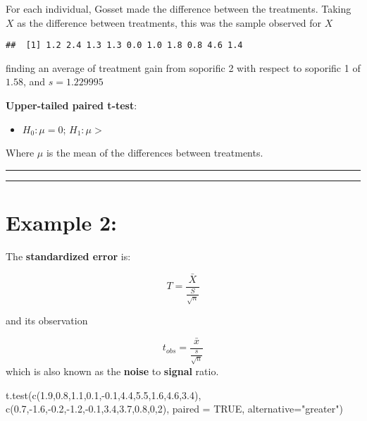 \documentclass[
]{book}
\newenvironment{Shaded}{\begin{snugshade}}{\end{snugshade}}
\newcommand{\AttributeTok}[1]{\textcolor[rgb]{0.77,0.63,0.00}{#1}}
\newcommand{\ConstantTok}[1]{\textcolor[rgb]{0.00,0.00,0.00}{#1}}
\newcommand{\DecValTok}[1]{\textcolor[rgb]{0.00,0.00,0.81}{#1}}
\newcommand{\FloatTok}[1]{\textcolor[rgb]{0.00,0.00,0.81}{#1}}
\newcommand{\FunctionTok}[1]{\textcolor[rgb]{0.00,0.00,0.00}{#1}}
\newcommand{\NormalTok}[1]{#1}
\newcommand{\SpecialCharTok}[1]{\textcolor[rgb]{0.00,0.00,0.00}{#1}}
\newcommand{\StringTok}[1]{\textcolor[rgb]{0.31,0.60,0.02}{#1}}
\providecommand{\tightlist}{%
  \setlength{\itemsep}{0pt}\setlength{\parskip}{0pt}}
\begin{document}
For each individual, Gosset made the difference between the treatments. Taking \(X\) as the difference between treatments, this was the sample observed for \(X\)

\begin{verbatim}
##  [1] 1.2 2.4 1.3 1.3 0.0 1.0 1.8 0.8 4.6 1.4
\end{verbatim}

finding an average of treatment gain from soporific 2 with respect to soporific 1 of \(1.58\), and \(s=1.229995\)

\textbf{Upper-tailed paired t-test}:

\begin{itemize}
\tightlist
\item
  \(H_0:\mu=0\); \(H_1:\mu >\)
\end{itemize}

Where \(\mu\) is the mean of the differences between treatments.

\begin{center}\rule{0.5\linewidth}{0.5pt}\end{center}

\begin{center}\rule{0.5\linewidth}{0.5pt}\end{center}

\hypertarget{example-2-5}{%
\section{Example 2:}\label{example-2-5}}

The \textbf{standardized error} is:

\[T=\frac{\bar{X}}{\frac{S}{\sqrt{n}}}\]

and its observation

\[t_{obs}=\frac{\bar{x}}{\frac{s}{\sqrt{n}}}\]
which is also known as the \textbf{noise} to \textbf{signal} ratio.

\begin{Shaded}
\begin{Highlighting}[]
\FunctionTok{t.test}\NormalTok{(}\FunctionTok{c}\NormalTok{(}\FloatTok{1.9}\NormalTok{,}\FloatTok{0.8}\NormalTok{,}\FloatTok{1.1}\NormalTok{,}\FloatTok{0.1}\NormalTok{,}\SpecialCharTok{{-}}\FloatTok{0.1}\NormalTok{,}\FloatTok{4.4}\NormalTok{,}\FloatTok{5.5}\NormalTok{,}\FloatTok{1.6}\NormalTok{,}\FloatTok{4.6}\NormalTok{,}\FloatTok{3.4}\NormalTok{),}
       \FunctionTok{c}\NormalTok{(}\FloatTok{0.7}\NormalTok{,}\SpecialCharTok{{-}}\FloatTok{1.6}\NormalTok{,}\SpecialCharTok{{-}}\FloatTok{0.2}\NormalTok{,}\SpecialCharTok{{-}}\FloatTok{1.2}\NormalTok{,}\SpecialCharTok{{-}}\FloatTok{0.1}\NormalTok{,}\FloatTok{3.4}\NormalTok{,}\FloatTok{3.7}\NormalTok{,}\FloatTok{0.8}\NormalTok{,}\DecValTok{0}\NormalTok{,}\DecValTok{2}\NormalTok{),}
       \AttributeTok{paired =} \ConstantTok{TRUE}\NormalTok{,}
       \AttributeTok{alternative=}\StringTok{"greater"}\NormalTok{)}
\end{Highlighting}
\end{Shaded}
\end{document}
